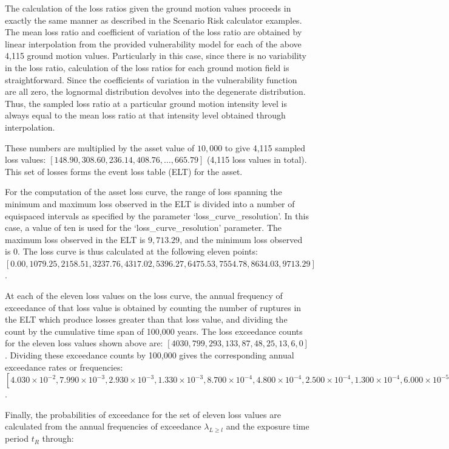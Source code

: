 The calculation of the loss ratios given the ground motion values proceeds in exactly the same manner as described in the Scenario Risk calculator examples. The mean loss ratio and coefficient of variation of the loss ratio are obtained by linear interpolation from the provided vulnerability model for each of the above 4,115 ground motion values. Particularly in this case, since there is no variability in the loss ratio, calculation of the loss ratios for each ground motion field is straightforward. Since the coefficients of variation in the vulnerability function are all zero, the lognormal distribution devolves into the degenerate distribution. Thus, the sampled loss ratio at a particular ground motion intensity level is always equal to the mean loss ratio at that intensity level obtained through interpolation.

These numbers are multiplied by the asset value of $10,000$ to give 4,115 sampled loss values: $[148.90, 308.60, 236.14, 408.76, \dots, 665.79]$ (4,115 loss values in total). This set of losses forms the event loss table (ELT) for the asset.

For the computation of the asset loss curve, the range of loss spanning the minimum and maximum loss observed in the ELT is divided into a number of equispaced intervals as specified by the parameter `loss\_curve\_resolution'. In this case, a value of ten is used for the `loss\_curve\_resolution' parameter. The maximum loss observed in the ELT is $9,713.29$, and the minimum loss observed is $0$. The loss curve is thus calculated at the following eleven points: $[0.00, 1079.25, 2158.51, 3237.76, 4317.02, 5396.27, 6475.53, 7554.78, 8634.03, 9713.29]$.

At each of the eleven loss values on the loss curve, the annual frequency of exceedance of that loss value is obtained by counting the number of ruptures in the ELT which produce losses greater than that loss value, and dividing the count by the cumulative time span of 100,000 years. The loss exceedance counts for the eleven loss values shown above are: $[4030, 799, 293, 133, 87, 48, 25, 13, 6, 0]$. Dividing these exceedance counts by 100,000 gives the corresponding annual exceedance rates or frequencies: $[4.030\times10^{-2}, 7.990\times10^{-3}, 2.930\times10^{-3}, 1.330\times10^{-3}, 8.700\times10^{-4}, 4.800\times10^{-4}, 2.500\times10^{-4}, 1.300\times10^{-4}, 6.000\times10^{-5}, 0.000]$.

Finally, the probabilities of exceedance for the set of eleven loss values are calculated from the annual frequencies of exceedance $\lambda_{L \geq l}$ and the exposure time period $t_R$ through:

